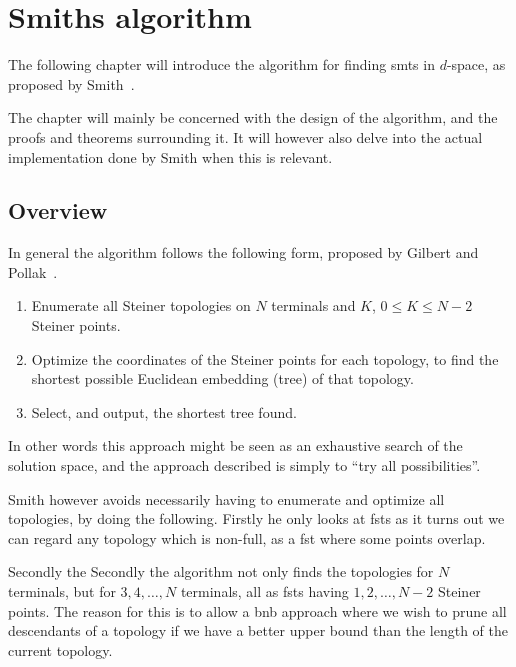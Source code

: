 { \abnormalparskip{0pt}
\chapter{Smiths algorithm}
\label{cha:algorithm} }


The following chapter will introduce the algorithm for finding \glspl{smt} in
$d$-space, as proposed by Smith~\cite{Smith1992}.

The chapter will mainly be concerned with the design of the algorithm, and the
proofs and theorems surrounding it.  It will however also delve into the actual
implementation done by Smith when this is relevant.

\section{Overview}
\label{sec:overview}

In general the algorithm follows the following form, proposed by Gilbert and
Pollak~\cite{Gilbert1968}.

\begin{enumerate}
\item Enumerate all Steiner topologies on $N$ terminals and $K$, $0 \le K \le
N-2$ Steiner points.
\item Optimize the coordinates of the Steiner points for each topology, to find
the shortest possible Euclidean embedding (tree) of that topology.
\item Select, and output, the shortest tree found.
\end{enumerate}

In other words this approach might be seen as an exhaustive search of the
solution space, and the approach described is simply to ``try all
possibilities''.

Smith however avoids necessarily having to enumerate and optimize all
topologies, by doing the following.  Firstly he only looks at \glspl{fst} as it
turns out we can regard any topology which is non-full, as a \gls{fst} where
some points overlap.

Secondly the Secondly the algorithm not only finds the topologies for $N$
terminals, but for $3, 4, \ldots, N$ terminals, all as \glspl{fst} having $1, 2,
\ldots, N-2$ Steiner points.  The reason for this is to allow a \gls{bnb}
approach where we wish to prune all descendants of a topology if we have a
better upper bound than the length of the current topology.

